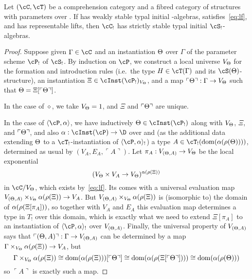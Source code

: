 \documentclass{amsart}
\def\name#1{\ulcorner #1\urcorner}
\let\S\cS
\let\P\cP
\def\emptyps{\diamond}
\def\typeps#1#2{\langle #1,#2\rangle}
\let\C\cC
\let\T\cT
\begin{document}
\begin{thm}\label{thm:lu-str-param}
  Let $(\C,\T)$ be a comprehension category and \S a fibred category of structures with parameters over \C.
  If \C has weakly stable typal initial \S-algebras, \C satisfies~\eqref{eq:lf}, and \S has representable lifts, then $\C_!$ has strictly stable typal initial $\S_!$-algebras.
\end{thm}
\begin{proof}
  Suppose given $\Gamma\in\C$ and an instantiation $\Theta$ over $\Gamma$ of the parameter scheme $\P_!$ of $\S_!$.
  By induction on $\P$, we construct a local universe $V_\Theta$ for the formation and introduction rules (i.e.\ the type $H\in\T(\Gamma)$ and its $\S(\Th)$-structure), an instantiation $\Xi\in\cInst(\P_!)_{V_\Th}$, and a map $\name{\Th} : \Gamma\to V_\Th$ such that $\Th = \Xi[\name{\Th}]$.

  In the case of $\emptyps$, we take $V_\Theta = 1$, and $\Xi$ and $\name{\Th}$ are unique.

  In the case of $\typeps{\P}{\al}$, we have inductively $\Th\in\cInst(\P_!)$ along with $V_\Theta$, $\Xi$, and $\name{\Th}$, and also $\al:\cInst(\P)\to\D$ over \C and (as the additional data extending $\Theta$ to a $\T_!$-instantiation of $\typeps{\P}{\al}_!$) a type $A\in\T_!(\mathrm{dom}(\al(\rho(\Th))))$, determined as usual by $(V_A,E_A,\name{A})$.
  Let $\pi_A : V_{(\Theta,A)}\to V_\Theta$ be the local exponential 
  \[ (V_\Theta \times V_A \to V_\Theta)^{\alpha(\rho(\Xi))} \]
  in $\C/V_\Th$, which exists by~\eqref{eq:lf}.
  Its comes with a universal evaluation map $V_{(\Theta,A)} \times_{V_\Theta} \alpha(\rho(\Xi)) \to V_A$.
  But $V_{(\Theta,A)} \times_{V_\Theta} \alpha(\rho(\Xi))$ is (isomorphic to) the domain of $\alpha(\rho(\Xi[\pi_A]))$, so together with $V_A$ and $E_A$ this evaluation map determines a type in $T_!$ over this domain, which is exactly what we need to extend $\Xi[\pi_A]$ to an instantiation of $\typeps{\P}{\al}_!$ over $V_{(\Theta,A)}$.
  Finally, the universal property of $V_{(\Theta,A)}$ says that $\name{(\Th,A)} : \Gamma \to V_{(\Th,A)}$ can be determined by a map $\Gamma \times_{V_\Theta} \alpha(\rho(\Xi)) \to V_A$, but
  \[\Gamma \times_{V_\Th} \al(\rho(\Xi)) \cong \mathrm{dom}(\al(\rho(\Xi)))[\name{\Th}] \cong \mathrm{dom}(\al(\rho(\Xi[\name{\Th}]))) \cong \mathrm{dom}(\al(\rho(\Th)))  \]
  so $\name{A}$ is exactly such a map.


\end{proof}
\end{document}
